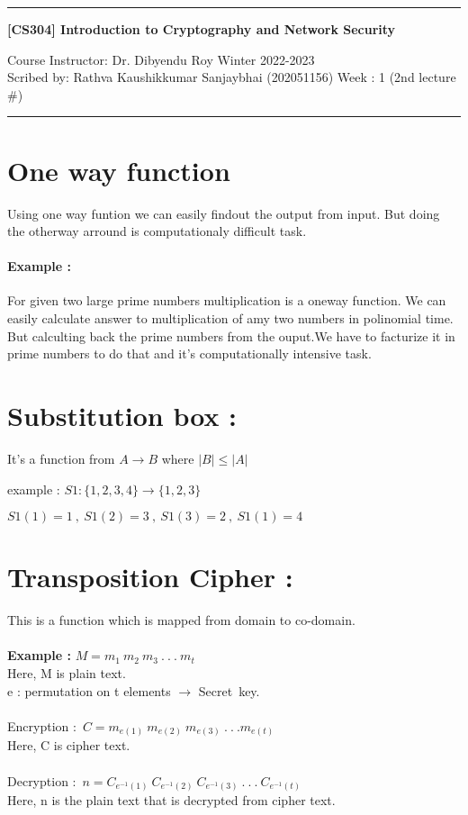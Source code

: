 \documentclass[11pt]{article}
\begin{document}

\noindent
\rule{\textwidth}{1pt}
\begin{center}
{\bf [CS304] Introduction to Cryptography and Network Security}
\end{center}
Course Instructor: Dr. Dibyendu Roy \hfill Winter 2022-2023\\
Scribed by: Rathva Kaushikkumar Sanjaybhai (202051156) \hfill Week : 1 (2nd lecture \#)
\\
\rule{\textwidth}{1pt}

\section{One way function}
Using one way funtion we can easily findout the output from input.
But doing the otherway arround is computationaly difficult task.

\paragraph{Example : }For given two large prime numbers multiplication is a oneway function.
We can easily calculate answer to multiplication of amy two numbers in polinomial time.
But calculting back the prime numbers from the ouput.We have to facturize it in prime numbers to do that and it's computationally intensive task.

\section{Substitution box : }
 It's a function from $ A \rightarrow B $
where $|B| \le |A|$ \newline

example : \newline
$S1 : \{1,2,3,4\} \rightarrow \{1,2,3\}$ \newline

$S1(1) = 1 \  ,\   
S1(2) = 3 \  , \  
S1(3) = 2 \  , \  
S1(1) = 4$

\section{Transposition Cipher :}
This is a function which is mapped from domain to co-domain.\\\\
\textbf{Example :} $M = m_1 \  m_2 \ m_3 \  .\  .\  .\  m_t $ \\
 Here, M is plain text. \\
e : permutation on t elements $\rightarrow{}$ Secret\  key. \\\\
Encryption :\ $C = m_{e(1)} \ m_{e(2)} \ m_{e(3)} \ . \ . \ . m_{e(t)} $ \\
Here, C is cipher text.\\\\
Decryption :\ $n = C_{e^{-1}(1)} \ C_{e^{-1}(2)} \ C_{e^{-1}(3)} \ .\ .\ .\ C_{e^{-1}(t)}$\\
Here, n is the plain text that is decrypted from cipher text.
\newpage
\end{document}
